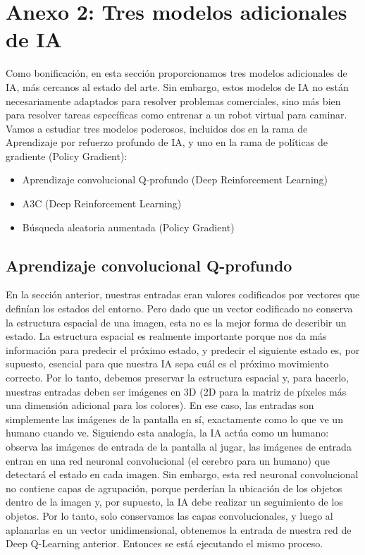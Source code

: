 \documentclass[]{book}
\providecommand{\tightlist}{%
  \setlength{\itemsep}{0pt}\setlength{\parskip}{0pt}}
\begin{document}
\hypertarget{anexo-2-tres-modelos-adicionales-de-ia}{%
\section{Anexo 2: Tres modelos adicionales de IA}\label{anexo-2-tres-modelos-adicionales-de-ia}}

Como bonificación, en esta sección proporcionamos tres modelos adicionales de IA, más cercanos al estado del arte. Sin embargo, estos modelos de IA no están necesariamente adaptados para resolver problemas comerciales, sino más bien para resolver tareas específicas como entrenar a un robot virtual para caminar. Vamos a estudiar tres modelos poderosos, incluidos dos en la rama de Aprendizaje por refuerzo profundo de IA, y uno en la rama de políticas de gradiente (Policy Gradient):

\begin{itemize}
\tightlist
\item
  Aprendizaje convolucional Q-profundo (Deep Reinforcement Learning)
\item
  A3C (Deep Reinforcement Learning)
\item
  Búsqueda aleatoria aumentada (Policy Gradient)
\end{itemize}

\hypertarget{aprendizaje-convolucional-q-profundo}{%
\subsection{Aprendizaje convolucional Q-profundo}\label{aprendizaje-convolucional-q-profundo}}

En la sección anterior, nuestras entradas eran valores codificados por vectores que definían los estados del entorno. Pero dado que un vector codificado no conserva la estructura espacial de una imagen, esta no es la mejor forma de describir un estado. La estructura espacial es realmente importante porque nos da más información para predecir el próximo estado, y predecir el siguiente estado es, por supuesto, esencial para que nuestra IA sepa cuál es el próximo movimiento correcto. Por lo tanto, debemos preservar la estructura espacial y, para hacerlo, nuestras entradas deben ser imágenes en 3D (2D para la matriz de píxeles más una dimensión adicional para los colores). En ese caso, las entradas son simplemente las imágenes de la pantalla en sí, exactamente como lo que ve un humano cuando ve. Siguiendo esta analogía, la IA actúa como un humano: observa las imágenes de entrada de la pantalla al jugar, las imágenes de entrada entran en una red neuronal convolucional (el cerebro para un humano) que detectará el estado en cada imagen. Sin embargo, esta red neuronal convolucional no contiene capas de agrupación, porque perderían la ubicación de los objetos dentro de la imagen y, por supuesto, la IA debe realizar un seguimiento de los objetos. Por lo tanto, solo conservamos las capas convolucionales, y luego al aplanarlas en un vector unidimensional, obtenemos la entrada de nuestra red de Deep Q-Learning anterior. Entonces se está ejecutando el mismo proceso.
\end{document}
